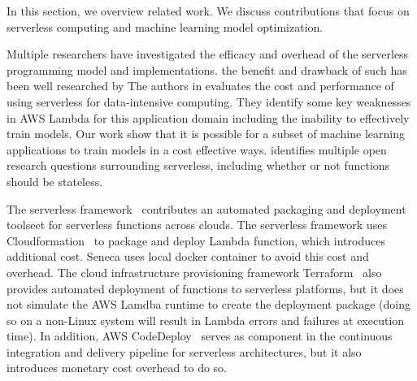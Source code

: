 In this section, we overview related work. We discuss contributions that focus
on serverless computing and machine learning model optimization. 

Multiple researchers have investigated the efficacy and overhead of the
serverless programming model and implementations.
the benefit and drawback of such has been well researched by
The authors in \cite{ref:onesteptwostep} evaluates the cost and performance of using
serverless for data-intensive computing.  They identify some key weaknesses in AWS
Lambda for this application domain including the inability to effectively train models.
Our work show that it is possible for a subset of machine learning applications to 
train models in a cost effective ways.
\cite{ref:baldini2017} identifies multiple open research questions surrounding serverless,
including whether or not functions should be stateless. 

The serverless framework~\cite{ref:serverless_framework} contributes an 
automated packaging and deployment toolseet for serverless functions across clouds. 
The serverless framework uses Cloudformation~\cite{ref:cloudformation} to package and deploy Lambda function, which introduces additional cost. Seneca uses local docker container to avoid this cost
and overhead. The cloud infrastructure provisioning framework Terraform~\cite{ref:terraform} 
also provides automated deployment of functions to serverless platforms, but it does not simulate the AWS Lamdba runtime to create the deployment package (doing so on a non-Linux system will result in Lambda errors and failures at execution time). 
In addition, AWS CodeDeploy~\cite{ref:codedeploy} serves as component in the continuous integration and delivery pipeline for serverless architectures, but it also introduces monetary cost overhead
to do so.

